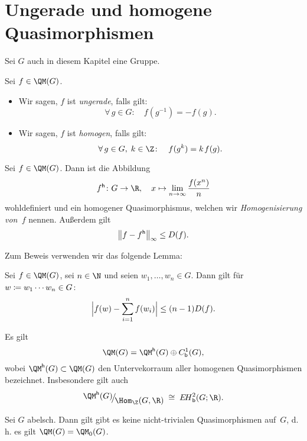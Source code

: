 \chapter{Ungerade und homogene Quasimorphismen}
\begin{thSetup}
    Sei $G$ auch in diesem Kapitel eine Gruppe.
\end{thSetup}

\begin{thDef}
    Sei $f\in\QM(G)$.
    \begin{itemize}
        \item
            Wir sagen, $f$ ist \emph{ungerade}, falls gilt:
            \[ \forall\,g\in G\colon\quad
                f(g^{-1}) = -f(g)
            . \]
            
        \item
            Wir sagen, $f$ ist \emph{homogen}, falls gilt:
            \[ \forall\,g\in G,\;k\in\Z\colon\quad
                f(g^k) = k \mkern2mu f(g)
            . \]
    \end{itemize}
\end{thDef}

\begin{thProposition}[Homogenisierung]
    Sei $f\in\QM(G)$. Dann ist die Abbildung
    \[ f\homo \colon G \to \R, \quad
        x\mapsto \lim_{n\to\infty} \frac{f(x^n)}{n}
    \]
    wohldefiniert und ein homogener Quasimorphismus, welchen wir
    \emph{Homogenisierung von~$f$} nennen. Außerdem gilt
    \[ \norm[\big]{f-f\homo}_\supr \leq D(f)  . \]
\end{thProposition}

Zum Beweis verwenden wir das folgende Lemma:

\begin{thLemma}
    Sei $f\in\QM(G)$, sei $n\in\N$ und seien
    $w_1,\dots,w_n\in G$. Dann gilt für $w\defeq w_1\cdots w_n\in G$:
    \[ \abs[\Big]{ f(w) - \isum^n f(w_i) } \leq (n-1) D(f)  . \]
\end{thLemma}

\begin{thKorollar}
    Es gilt
    \[ \QM(G) = \QM\homo(G) \oplus \Cb^1(G)  , \]
    wobei $\QM\homo(G) \subset \QM(G)$ den Untervekorraum aller homogenen
    Quasimorphismen bezeichnet. Insbesondere gilt auch
    \[ \Quot{\QM\homo(G)}{\Hom_\Z(G,\R)} \;\cong\; \EHb^2(G;\R)  . \]
\end{thKorollar}

\begin{thKorollar}
    Sei $G$ abelsch. Dann gilt gibt es keine nicht-trivialen
    Quasimorphismen auf~$G$, d.\,h. es gilt $\QM(G) = \QM_0(G)$.
\end{thKorollar}
